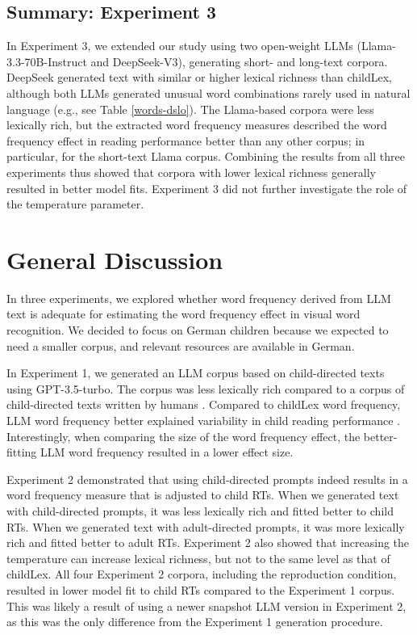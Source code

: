 \documentclass[manuscript]{stjour}
\begin{document}
\subsection*{Summary: Experiment 3}

In Experiment 3, we extended our study using two open-weight LLMs (Llama-3.3-70B-Instruct and DeepSeek-V3), generating short- and long-text corpora. DeepSeek generated text with similar or higher lexical richness than childLex, although both LLMs generated unusual word combinations rarely used in natural language (e.g., see Table \ref{words-dslo}). The Llama-based corpora were less lexically rich, but the extracted word frequency measures described the word frequency effect in reading performance better than any other corpus; in particular, for the short-text Llama corpus. Combining the results from all three experiments thus showed that corpora with lower lexical richness generally resulted in better model fits. Experiment 3 did not further investigate the role of the temperature parameter. 


\section*{General Discussion}

In three experiments, we explored whether word frequency derived from LLM text is adequate for estimating the word frequency effect in visual word recognition. We decided to focus on German children because we expected to need a smaller corpus, and relevant resources are available in German. 

In Experiment 1, we generated an LLM corpus based on child-directed texts using GPT-3.5-turbo. The corpus was less lexically rich compared to a corpus of child-directed texts written by humans \citep[childLex; ][]{schroeder_childlex_2015}. Compared to childLex word frequency, LLM word frequency better explained variability in child reading performance \citep[lexical decision reaction times for 1000+ words taken from DeveL; ][]{schroter_developmental_2017}. Interestingly, when comparing the size of the word frequency effect, the better-fitting LLM word frequency resulted in a lower effect size.   

Experiment 2 demonstrated that using child-directed prompts indeed results in a word frequency measure that is adjusted to child RTs. When we generated text with child-directed prompts, it was less lexically rich and fitted better to child RTs. When we generated text with adult-directed prompts, it was more lexically rich and fitted better to adult RTs. Experiment 2 also showed that increasing the temperature can increase lexical richness, but not to the same level as that of childLex. All four Experiment 2 corpora, including the reproduction condition, resulted in lower model fit to child RTs compared to the Experiment 1 corpus. This was likely a result of using a newer snapshot LLM version in Experiment 2, as this was the only difference from the Experiment 1 generation procedure.
\end{document}

